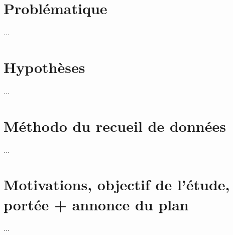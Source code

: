 \section{Problématique}
...
\section{Hypothèses}
...
\section{Méthodo du recueil de données}
...
\section{Motivations, objectif de l'étude, portée + annonce du plan}
...






